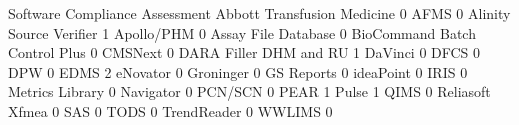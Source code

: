 \documentclass{article}
\begin{document}
\begin{Schunk}
\begin{Soutput}
                                Software Compliance Assessment
  Abbott Transfusion Medicine                                0
  AFMS                                                       0
  Alinity Source Verifier                                    1
  Apollo/PHM                                                 0
  Assay File Database                                        0
  BioCommand Batch Control Plus                              0
  CMSNext                                                    0
  DARA Filler DHM and RU                                     1
  DaVinci                                                    0
  DFCS                                                       0
  DPW                                                        0
  EDMS                                                       2
  eNovator                                                   0
  Groninger                                                  0
  GS Reports                                                 0
  ideaPoint                                                  0
  IRIS                                                       0
  Metrics Library                                            0
  Navigator                                                  0
  PCN/SCN                                                    0
  PEAR                                                       1
  Pulse                                                      1
  QIMS                                                       0
  Reliasoft Xfmea                                            0
  SAS                                                        0
  TODS                                                       0
  TrendReader                                                0
  WWLIMS                                                     0
                               

\end{Soutput}
\end{Schunk}
\end{document}
